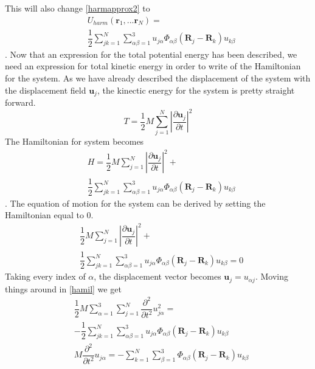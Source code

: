 \begin{equation}
\end{equation}This will also change \cref{harmapprox2} to\begin{align}
    &U_{harm}(\mathbf{r}_{1},...\mathbf{r}_{N})=\nonumber\\
    &\dfrac{1}{2}\sum_{jk=1}^{N}\sum_{\alpha\beta=1}^{3}u_{j\alpha}\Phi_{\alpha\beta}(\mathbf{R}_{j}-\mathbf{R}_{k})u_{k\beta}
\end{align}. Now that an expression for the total potential energy has been described, we need an expression for total kinetic energy in order to write of the Hamiltonian for the system. As we have already described the displacement of the system with the displacement field $\mathbf{u}_{j}$, the kinectic energy for the system is pretty straight forward.\begin{equation}
    T=\dfrac{1}{2}M\sum_{j=1}^{N}\left|\dfrac{\partial\mathbf{u}_{j}}{\partial t}\right|^{2}
\end{equation}The Hamiltonian for system becomes\begin{align}
    & H=\dfrac{1}{2}M\sum_{j=1}^{N}\left|\dfrac{\partial\mathbf{u}_{j}}{\partial t}\right|^{2}+\nonumber\\
    & \dfrac{1}{2}\sum_{jk=1}^{N}\sum_{\alpha\beta=1}^{3}u_{j\alpha}\Phi_{\alpha\beta}(\mathbf{R}_{j}-\mathbf{R}_{k})u_{k\beta}
\end{align}. The equation of motion for the system can be derived by setting the Hamiltonian equal to 0.\begin{align}
    & \dfrac{1}{2}M\sum_{j=1}^{N}\left|\dfrac{\partial\mathbf{u}_{j}}{\partial t}\right|^{2}+\nonumber\\
    & \dfrac{1}{2}\sum_{jk=1}^{N}\sum_{\alpha\beta=1}^{3}u_{j\alpha}\Phi_{\alpha\beta}(\mathbf{R}_{j}-\mathbf{R}_{k})u_{k\beta}=0\label{hamil}
\end{align} Taking every index of $\alpha$, the displacement vector becomes $\mathbf{u}_{j}=u_{\alpha j}$. Moving things around in \cref{hamil} we get\begin{align}
     & \dfrac{1}{2}M\sum_{\alpha=1}^{3}\sum_{j=1}^{N}\dfrac{\partial^{2}}{\partial t^{2}}u_{j\alpha}^{2}=\nonumber\\
    & -\dfrac{1}{2}\sum_{jk=1}^{N}\sum_{\alpha\beta=1}^{3}u_{j\alpha}\Phi_{\alpha\beta}(\mathbf{R}_{j}-\mathbf{R}_{k})u_{k\beta}\\
    & M\dfrac{\partial^{2}}{\partial t^{2}}u_{j\alpha}=-\sum_{k=1}^{N}\sum_{\beta=1}^{3}\Phi_{\alpha\beta}(\mathbf{R}_{j}-\mathbf{R}_{k})u_{k\beta}

\end{align}

